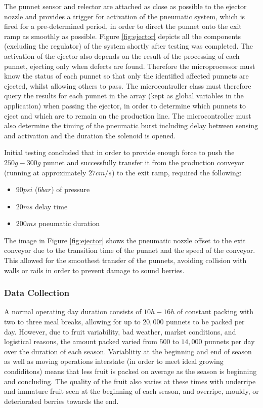 \documentclass[fleqn,twoside]{article}
\begin{document}
The punnet sensor and relector are attached as close as possible to the ejector nozzle and provides a trigger for activation of the pneumatic system, which is fired for a pre-determined period, in order to direct the punnet onto the exit ramp as smoothly as possible. Figure \ref{fig:ejector} depicts all the components (excluding the regulator) of the system shortly after testing was completed. The activation of the ejector also depends on the result of the processing of each punnet, ejecting only when defects are found. Therefore the microprocessor must know the status of each punnet so that only the identified affected punnets are ejected, whilst allowing others to pass. The microcontroller class must therefore query the results for each punnet in the array (kept as global variables in the application) when passing the ejector, in order to determine which punnets to eject and which are to remain on the production line. The microcontroller must also determine the timing of the pneumatic burst including delay between sensing and activation and the duration the solenoid is opened. 

Initial testing concluded that in order to provide enough force to push the $250g-300g$ punnet and successfully transfer it from the production conveyor (running at approximately $27cm/s$) to the exit ramp, required the following:
\begin{itemize}
	\item $90psi$ ($6bar$) of pressure
	\item $20ms$ delay time
	\item $200ms$ pneumatic duration
\end{itemize}

The image in Figure \ref{fig:ejector} shows the pneumatic nozzle offset to the exit conveyor due to the transition time of the punnet and the speed of the conveyor. This allowed for the smoothest transfer of the punnets, avoiding collision with walls or rails in order to prevent damage to sound berries.


\subsubsection{Data Collection}

A normal operating day duration consists of $10h-16h$ of constant packing with two to three meal breaks, allowing for up to $20,000$ punnets to be packed per day. However, due to fruit variability, bad weather, market conditions, and logistical reasons, the amount packed varied from $500$ to $14,000$ punnets per day over the duration of each season. Variablitiy at the beginning and end of season as well as moving operations interstate (in order to meet ideal growing condiditons) means that less fruit is packed on average as the season is beginning and concluding. The quality of the fruit also varies at these times with underripe and immature fruit seen at the beginning of each season, and overripe, mouldy, or deteriorated berries towards the end.
\end{document}
